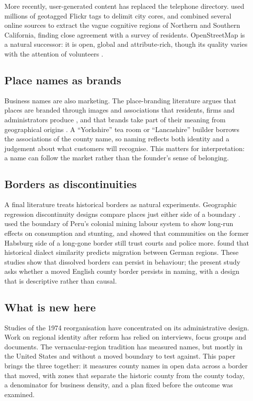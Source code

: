 \documentclass[11pt,a4paper]{article}
\begin{document}
More recently, user-generated content has replaced the telephone directory. \citet{hollenstein2010} used millions of geotagged Flickr tags to delimit city cores, and \citet{gao2017} combined several online sources to extract the vague cognitive regions of Northern and Southern California, finding close agreement with a survey of residents. OpenStreetMap is a natural successor: it is open, global and attribute-rich, though its quality varies with the attention of volunteers \citep{goodchild2007,haklay2010}.

\subsection{Place names as brands}
Business names are also marketing. The place-branding literature argues that places are branded through images and associations that residents, firms and administrators produce \citep{kavaratzis2004,kavaratzis2005}, and that brands take part of their meaning from geographical origins \citep{pike2015}. A ``Yorkshire'' tea room or ``Lancashire'' builder borrows the associations of the county name, so naming reflects both identity and a judgement about what customers will recognise. This matters for interpretation: a name can follow the market rather than the founder's sense of belonging.

\subsection{Borders as discontinuities}
A final literature treats historical borders as natural experiments. Geographic regression discontinuity designs compare places just either side of a boundary \citep{keele2015}. \citet{dell2010} used the boundary of Peru's colonial mining labour system to show long-run effects on consumption and stunting, and \citet{becker2016} showed that communities on the former Habsburg side of a long-gone border still trust courts and police more. \citet{falck2012} found that historical dialect similarity predicts migration between German regions. These studies show that dissolved borders can persist in behaviour; the present study asks whether a moved English county border persists in naming, with a design that is descriptive rather than causal.

\subsection{What is new here}
Studies of the 1974 reorganisation have concentrated on its administrative design. Work on regional identity after reform has relied on interviews, focus groups and documents. The vernacular-region tradition has measured names, but mostly in the United States and without a moved boundary to test against. This paper brings the three together: it measures county names in open data across a border that moved, with zones that separate the historic county from the county today, a denominator for business density, and a plan fixed before the outcome was examined.
\end{document}
